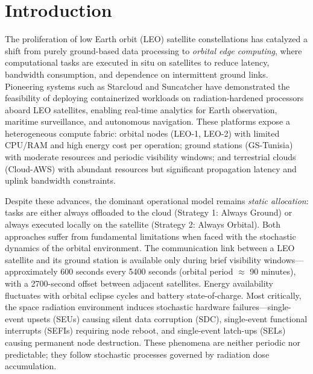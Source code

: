 \documentclass[conference]{IEEEtran}
\begin{document}
\section{Introduction}
\label{sec:introduction}

The proliferation of low Earth orbit (LEO) satellite constellations has catalyzed a shift from purely ground-based data processing to \textit{orbital edge computing}, where computational tasks are executed in situ on satellites to reduce latency, bandwidth consumption, and dependence on intermittent ground links. Pioneering systems such as Starcloud and Suncatcher have demonstrated the feasibility of deploying containerized workloads on radiation-hardened processors aboard LEO satellites, enabling real-time analytics for Earth observation, maritime surveillance, and autonomous navigation. These platforms expose a heterogeneous compute fabric: orbital nodes (LEO-1, LEO-2) with limited CPU/RAM and high energy cost per operation; ground stations (GS-Tunisia) with moderate resources and periodic visibility windows; and terrestrial clouds (Cloud-AWS) with abundant resources but significant propagation latency and uplink bandwidth constraints.

Despite these advances, the dominant operational model remains \textit{static allocation}: tasks are either always offloaded to the cloud (Strategy 1: Always Ground) or always executed locally on the satellite (Strategy 2: Always Orbital). Both approaches suffer from fundamental limitations when faced with the stochastic dynamics of the orbital environment. The communication link between a LEO satellite and its ground station is available only during brief visibility windows---approximately 600 seconds every 5400 seconds (orbital period $\approx$ 90 minutes), with a 2700-second offset between adjacent satellites. Energy availability fluctuates with orbital eclipse cycles and battery state-of-charge. Most critically, the space radiation environment induces stochastic hardware failures---single-event upsets (SEUs) causing silent data corruption (SDC), single-event functional interrupts (SEFIs) requiring node reboot, and single-event latch-ups (SELs) causing permanent node destruction. These phenomena are neither periodic nor predictable; they follow stochastic processes governed by radiation dose accumulation.
\end{document}
